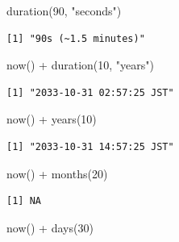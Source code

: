 \documentclass[
  letterpaper,
  DIV=11,
  numbers=noendperiod]{scrreprt}
\newenvironment{Shaded}{\begin{snugshade}}{\end{snugshade}}
\newcommand{\DecValTok}[1]{\textcolor[rgb]{0.68,0.00,0.00}{#1}}
\newcommand{\FunctionTok}[1]{\textcolor[rgb]{0.28,0.35,0.67}{#1}}
\newcommand{\NormalTok}[1]{\textcolor[rgb]{0.00,0.23,0.31}{#1}}
\newcommand{\SpecialCharTok}[1]{\textcolor[rgb]{0.37,0.37,0.37}{#1}}
\newcommand{\StringTok}[1]{\textcolor[rgb]{0.13,0.47,0.30}{#1}}
\begin{document}
\begin{Shaded}
\begin{Highlighting}[]
\FunctionTok{duration}\NormalTok{(}\DecValTok{90}\NormalTok{, }\StringTok{"seconds"}\NormalTok{)}
\end{Highlighting}
\end{Shaded}

\begin{verbatim}
[1] "90s (~1.5 minutes)"
\end{verbatim}

\begin{Shaded}
\begin{Highlighting}[]
\FunctionTok{now}\NormalTok{() }\SpecialCharTok{+} \FunctionTok{duration}\NormalTok{(}\DecValTok{10}\NormalTok{, }\StringTok{"years"}\NormalTok{)}
\end{Highlighting}
\end{Shaded}

\begin{verbatim}
[1] "2033-10-31 02:57:25 JST"
\end{verbatim}

\begin{Shaded}
\begin{Highlighting}[]
\FunctionTok{now}\NormalTok{() }\SpecialCharTok{+} \FunctionTok{years}\NormalTok{(}\DecValTok{10}\NormalTok{)}
\end{Highlighting}
\end{Shaded}

\begin{verbatim}
[1] "2033-10-31 14:57:25 JST"
\end{verbatim}

\begin{Shaded}
\begin{Highlighting}[]
\FunctionTok{now}\NormalTok{() }\SpecialCharTok{+} \FunctionTok{months}\NormalTok{(}\DecValTok{20}\NormalTok{)}
\end{Highlighting}
\end{Shaded}

\begin{verbatim}
[1] NA
\end{verbatim}

\begin{Shaded}
\begin{Highlighting}[]
\FunctionTok{now}\NormalTok{() }\SpecialCharTok{+} \FunctionTok{days}\NormalTok{(}\DecValTok{30}\NormalTok{)}
\end{Highlighting}
\end{Shaded}
\end{document}
